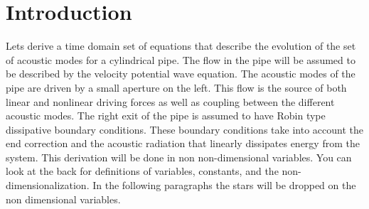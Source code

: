 \documentclass[superscriptaddress, onecolumn, prl]{revtex4}
\begin{document}
\section{Introduction}
Lets derive a time domain set of equations that describe the evolution of the set of acoustic modes for a cylindrical pipe. The flow in the pipe will be assumed to be described by the velocity potential wave equation. The acoustic modes of the pipe are driven by a small aperture on the left. This flow is the source of both linear and nonlinear driving forces as well as coupling between the different acoustic modes. The right exit of the pipe is assumed to have Robin type dissipative boundary conditions. These boundary conditions take into account the end correction and the acoustic radiation that linearly dissipates energy from the system. This derivation will be done in non non-dimensional variables. You can look at the back for definitions of variables, constants, and the non-dimensionalization. In the following paragraphs the stars will be dropped on the non dimensional variables. 
\end{document}
